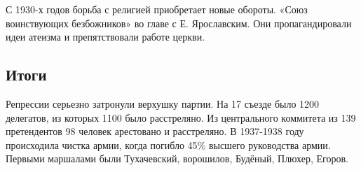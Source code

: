 С 1930-х годов борьба с религией приобретает новые обороты. «Союз воинствующих безбожников» во главе с Е. Ярославским. Они пропагандировали идеи атеизма и препятствовали работе церкви.

\subsection{Итоги}

Репрессии серьезно затронули верхушку партии. На 17 съезде было 1200 делегатов, из которых 1100 было расстреляно. Из центрального коммитета из 139 претендентов 98 человек арестовано и расстреляно. 
В 1937-1938 году происходила чистка армии, когда погибло 45\% высшего руководства армии.
Первыми маршалами были Тухачевский, ворошилов, Будёный, Плюхер, Егоров. 